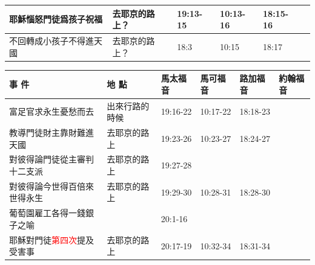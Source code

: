 \begin{table}[H]
\begin{tabular}{p{14em}|p{7.93em}|l|l|l|p{4.855em}}
耶穌惱怒門徒爲孩子祝福 &去耶京的路上？& \multicolumn{1}{p{5.285em}|}{19:13-15} & \multicolumn{1}{p{5.57em}|}{10:13-16} & \multicolumn{1}{p{5.285em}|}{18:15-16} & \multicolumn{1}{l}{} \\\midrule

不回轉成小孩子不得進天國&去耶京的路上？& \multicolumn{1}{p{5.285em}|}{18:3} & \multicolumn{1}{p{5.57em}|}{10:15} & \multicolumn{1}{p{5.285em}|}{18:17} & \multicolumn{1}{l}{} \\\midrule
\end{tabular}%
\end{table}%

\begin{table}[H]
  \centering
    \begin{tabular}{p{14em}|p{7.93em}|l|l|l|p{4.855em}}
    \toprule
    \textbf{事 件} & \textbf{地 點} & \multicolumn{1}{p{5.285em}|}{\textbf{馬太福音}} & \multicolumn{1}{p{5.57em}|}{\textbf{馬可福音}} & \multicolumn{1}{p{5.285em}|}{\textbf{路加福音}} & \textbf{約翰福音} \\  \midrule

富足官求永生憂愁而去&出來行路的時候&\multicolumn{1}{p{5.285em}|}{19:16-22}&\multicolumn{1}{p{5.285em}|}{10:17-22}& \multicolumn{1}{p{5.285em}|}{18:18-23} & \multicolumn{1}{l}{} \\\midrule

教導門徒財主靠財難進天國&去耶京的路上& \multicolumn{1}{p{5.285em}|}{19:23-26} & \multicolumn{1}{p{5.57em}|}{10:23-27} & \multicolumn{1}{p{5.285em}|}{18:24-27} & \multicolumn{1}{l}{} \\\midrule

對彼得論門徒從主審判十二支派&去耶京的路上& \multicolumn{1}{p{5.285em}|}{19:27-28} & \multicolumn{1}{p{5.57em}|}{} & \multicolumn{1}{p{5.285em}|}{} & \multicolumn{1}{l}{} \\\midrule

對彼得論今世得百倍來世得永生&去耶京的路上& \multicolumn{1}{p{5.285em}|}{19:29-30} & \multicolumn{1}{p{5.57em}|}{10:28-31} & \multicolumn{1}{p{5.285em}|}{18:28-30} & \multicolumn{1}{l}{} \\\midrule

葡萄園雇工各得一錢銀子之喻 && \multicolumn{1}{p{5.285em}|}{20:1-16} &       &       & \multicolumn{1}{l}{} \\\midrule

耶穌對門徒\textcolor{red}{第四次}提及受害事 &去耶京的路上& \multicolumn{1}{p{5.285em}|}{20:17-19} & \multicolumn{1}{p{5.57em}|}{10:32-34} & \multicolumn{1}{p{5.285em}|}{18:31-34} & \multicolumn{1}{l}{} \\\midrule



\end{tabular}
\end{table}
